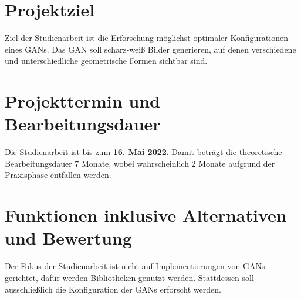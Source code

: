 
\newcommand{\Titel}{Projektdefinition}


\section{Projektziel}
Ziel der Studienarbeit ist die Erforschung möglichst optimaler Konfigurationen eines GANs.
Das GAN soll scharz-weiß Bilder generieren, auf denen verschiedene und unterschiedliche geometrische Formen sichtbar sind.

\section{Projekttermin und Bearbeitungsdauer}
Die Studienarbeit ist bis zum \textbf{16. Mai 2022}.
Damit beträgt die theoretische Bearbeitungsdauer 7 Monate, wobei wahrscheinlich 2 Monate aufgrund der Praxisphase entfallen werden.

\section{Funktionen inklusive Alternativen und Bewertung}
Der Fokus der Studienarbeit ist nicht auf Implementierungen von GANs gerichtet, dafür werden Bibliotheken genutzt werden.
Stattdessen soll ausschließlich die Konfiguration der GANs erforscht werden.


